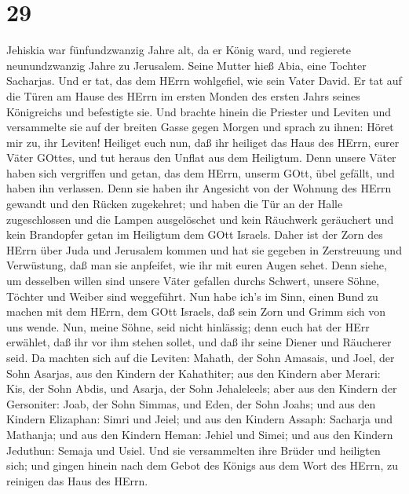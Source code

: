 \hypertarget{section-28}{%
\section{29}\label{section-28}}

 Jehiskia war fünfundzwanzig Jahre alt, da er König ward,
und regierete neunundzwanzig Jahre zu Jerusalem. Seine Mutter hieß Abia,
eine Tochter Sacharjas.  Und er tat, das dem HErrn
wohlgefiel, wie sein Vater David.  Er tat auf die Türen am
Hause des HErrn im ersten Monden des ersten Jahrs seines Königreichs und
befestigte sie.  Und brachte hinein die Priester und Leviten
und versammelte sie auf der breiten Gasse gegen Morgen  und
sprach zu ihnen: Höret mir zu, ihr Leviten! Heiliget euch nun, daß ihr
heiliget das Haus des HErrn, eurer Väter GOttes, und tut heraus den
Unflat aus dem Heiligtum.  Denn unsere Väter haben sich
vergriffen und getan, das dem HErrn, unserm GOtt, übel gefällt, und
haben ihn verlassen. Denn sie haben ihr Angesicht von der Wohnung des
HErrn gewandt und den Rücken zugekehret;  und haben die Tür
an der Halle zugeschlossen und die Lampen ausgelöschet und kein
Räuchwerk geräuchert und kein Brandopfer getan im Heiligtum dem GOtt
Israels.  Daher ist der Zorn des HErrn über Juda und
Jerusalem kommen und hat sie gegeben in Zerstreuung und Verwüstung, daß
man sie anpfeifet, wie ihr mit euren Augen sehet.  Denn
siehe, um desselben willen sind unsere Väter gefallen durchs Schwert,
unsere Söhne, Töchter und Weiber sind weggeführt.  Nun habe
ich's im Sinn, einen Bund zu machen mit dem HErrn, dem GOtt Israels, daß
sein Zorn und Grimm sich von uns wende.  Nun, meine Söhne,
seid nicht hinlässig; denn euch hat der HErr erwählet, daß ihr vor ihm
stehen sollet, und daß ihr seine Diener und Räucherer seid.
 Da machten sich auf die Leviten: Mahath, der Sohn Amasais,
und Joel, der Sohn Asarjas, aus den Kindern der Kahathiter; aus den
Kindern aber Merari: Kis, der Sohn Abdis, und Asarja, der Sohn
Jehaleleels; aber aus den Kindern der Gersoniter: Joab, der Sohn Simmas,
und Eden, der Sohn Joahs;  und aus den Kindern Elizaphan:
Simri und Jeiel; und aus den Kindern Assaph: Sacharja und Mathanja;
 und aus den Kindern Heman: Jehiel und Simei; und aus den
Kindern Jeduthun: Semaja und Usiel.  Und sie versammelten
ihre Brüder und heiligten sich; und gingen hinein nach dem Gebot des
Königs aus dem Wort des HErrn, zu reinigen das Haus des HErrn.
